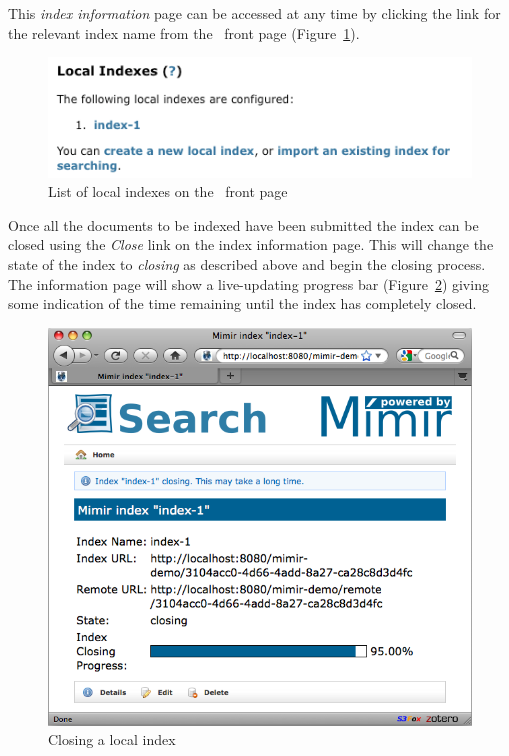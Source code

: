 This {\em index information} page can be accessed at any time by clicking the
link for the relevant index name from the \Mimir\ front page
(Figure~\ref{fig:local-index-list}).
%
\begin{figure}[htb!]
\begin{center}
\includegraphics[scale=0.5]{img/local-index-list}
\end{center}
\caption{List of local indexes on the \Mimir\ front page}
\label{fig:local-index-list}
\end{figure}
%
Once all the documents to be indexed have been submitted the index can be
closed using the {\em Close} link on the index information page.  This will
change the state of the index to {\em closing} as described above and begin the
closing process.  The information page will show a live-updating progress bar
(Figure~\ref{fig:local-index-closing}) giving some indication of the time
remaining until the index has completely closed.
%
\begin{figure}[htb!]
\begin{center}
\includegraphics[scale=0.5]{img/local-index-closing}
\end{center}
\caption{Closing a local index}
\label{fig:local-index-closing}
\end{figure}
%

